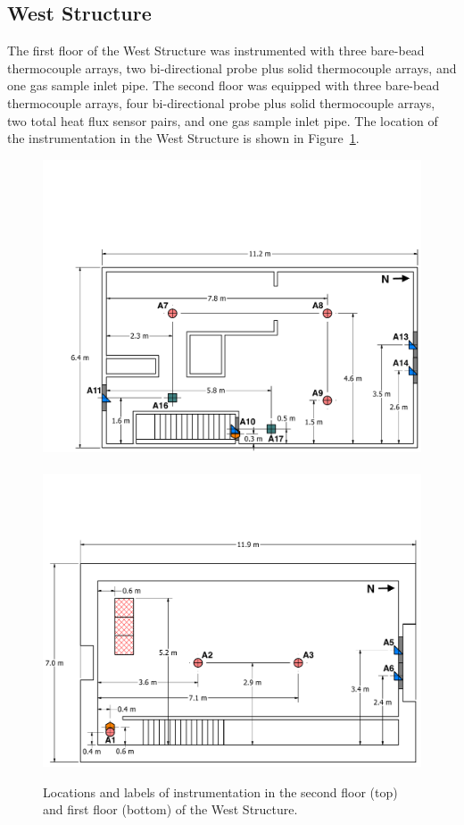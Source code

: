 \subsection{West Structure}
The first floor of the West Structure was instrumented with three bare-bead thermocouple arrays, two bi-directional probe plus solid thermocouple arrays, and one gas sample inlet pipe. The second floor was equipped with three bare-bead thermocouple arrays, four bi-directional probe plus solid thermocouple arrays, two total heat flux sensor pairs, and one gas sample inlet pipe. The location of the instrumentation in the West Structure is shown in Figure~\ref{fig:west_instrumentation}.

\begin{figure}[!ht]
	\centering
	\includegraphics[width=0.94\columnwidth]{Figures/Floor_Plans/West_Structure_2nd_Floor_Dimensioned_Instrumentation}
	\\~\\
	\includegraphics[width=\columnwidth]{Figures/Floor_Plans/West_Structure_1st_Floor_Dimensioned_Instrumentation}
	\caption[Locations and labels of instrumentation in the West Structure.]{Locations and labels of instrumentation in the second floor (top) and first floor (bottom) of the West Structure.}
	\label{fig:west_instrumentation}
\end{figure}

